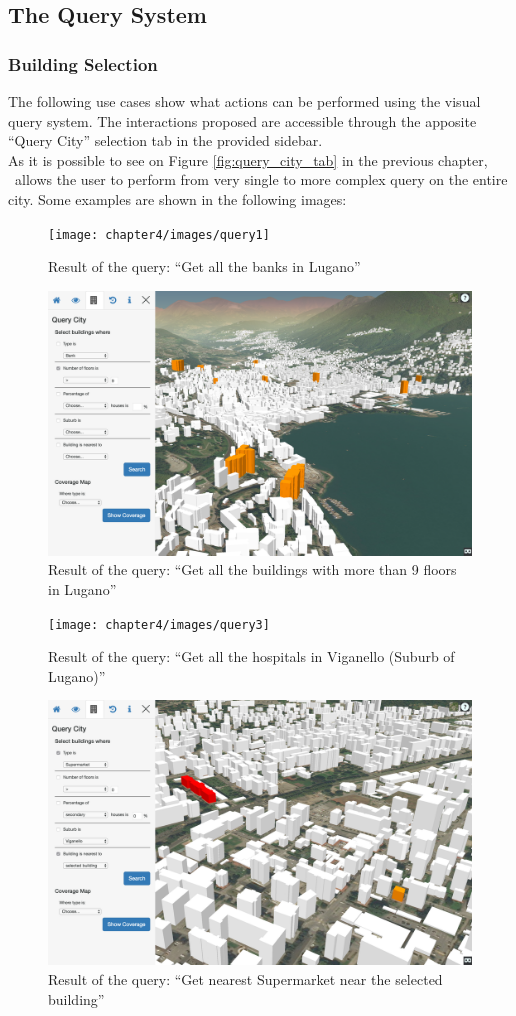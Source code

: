 \subsection{The Query System}
\subsubsection{Building Selection}
The following use cases show what actions can be performed using the visual query system. The interactions proposed are accessible through the apposite ``Query City'' selection tab in the provided sidebar.\\
As it is possible to see on Figure \ref{fig:query_city_tab} in the previous chapter, \applicationName\ allows the user to perform from very single to more complex query on the entire city. Some examples are shown in the following images:
\begin{figure} [H]
\centering
\texttt{[image: chapter4/images/query1]}
\caption{Result of the query: ``Get all the banks in Lugano''}
\label{fig:query1}
\end{figure} 
\begin{figure} [H]
\centering
\includegraphics[width=.8\textwidth]{chapter4/images/query2}
\caption{Result of the query: ``Get all the buildings with more than 9 floors in Lugano''}
\label{fig:query2}
\end{figure} 
\begin{figure} [H]
\centering
\texttt{[image: chapter4/images/query3]}
\caption{Result of the query: ``Get all the hospitals in Viganello (Suburb of Lugano)''}
\label{fig:query3}
\end{figure} 
\begin{figure} [H]
\centering
\includegraphics[width=.8\textwidth]{chapter4/images/query4}
\caption{Result of the query: ``Get nearest Supermarket near the selected building''}
\label{fig:query4}
\end{figure} 
